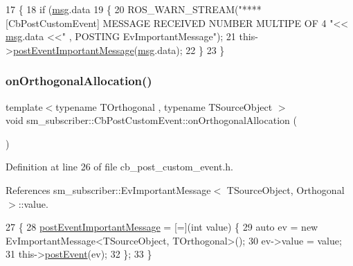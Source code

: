\begin{DoxyCode}
17   \{
18     \textcolor{keywordflow}{if} (\hyperlink{namespacebattery__monitor__node_ab1920c64448816edd4064e494275fdff}{msg}.data %
19     \{
20       ROS\_WARN\_STREAM(\textcolor{stringliteral}{"**** [CbPostCustomEvent] MESSAGE RECEIVED NUMBER MULTIPE OF 4 "}<< 
      \hyperlink{namespacebattery__monitor__node_ab1920c64448816edd4064e494275fdff}{msg}.data <<\textcolor{stringliteral}{" , POSTING EvImportantMessage"});
21       this->\hyperlink{classsm__subscriber_1_1CbPostCustomEvent_a671b613e1b9223a0d1cbe06782e28a06}{postEventImportantMessage}(\hyperlink{namespacebattery__monitor__node_ab1920c64448816edd4064e494275fdff}{msg}.data);
22     \}
23   \}
\end{DoxyCode}
\mbox{\label{classsm__subscriber_1_1CbPostCustomEvent_a7bfed2421f096e09355150a963b1b1f4}} 
\subsubsection{\texorpdfstring{on\+Orthogonal\+Allocation()}{onOrthogonalAllocation()}}
{\footnotesize\ttfamily template$<$typename T\+Orthogonal , typename T\+Source\+Object $>$ \\
void sm\+\_\+subscriber\+::\+Cb\+Post\+Custom\+Event\+::on\+Orthogonal\+Allocation (\begin{DoxyParamCaption}{ }\end{DoxyParamCaption})\hspace{0.3cm}{\ttfamily [inline]}}



Definition at line 26 of file cb\+\_\+post\+\_\+custom\+\_\+event.\+h.



References sm\+\_\+subscriber\+::\+Ev\+Important\+Message$<$ T\+Source\+Object, Orthogonal $>$\+::value.


\begin{DoxyCode}
27   \{
28     \hyperlink{classsm__subscriber_1_1CbPostCustomEvent_a671b613e1b9223a0d1cbe06782e28a06}{postEventImportantMessage} = [=](\textcolor{keywordtype}{int} value) \{
29       \textcolor{keyword}{auto} ev = \textcolor{keyword}{new} EvImportantMessage<TSourceObject, TOrthogonal>();
30       ev->value =  value;
31       this->\hyperlink{classsmacc_1_1ISmaccClientBehavior_a5db577c585935114058770f2b7242f8a}{postEvent}(ev);
32     \};
33   \}
\end{DoxyCode}


